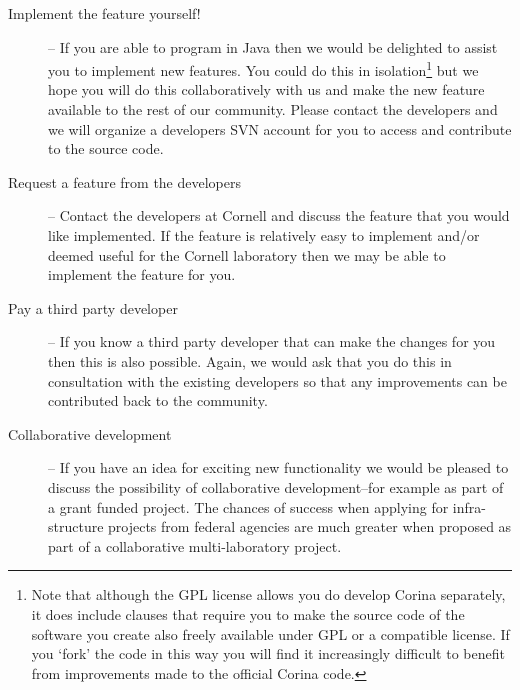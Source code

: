 \begin{description}
 \item[Implement the feature yourself!] -- If you are able to program in Java then we would be delighted to assist you to implement new features.  You could do this in isolation\footnote{Note that although the GPL license allows you do develop Corina separately, it does include clauses that require you to make the source code of the software you create also freely available under GPL or a compatible license. If you `fork' the code in this way you will find it increasingly difficult to benefit from improvements made to the official Corina code.} but we hope you will do this collaboratively with us and make the new feature available to the rest of our community.  Please contact the developers and we will organize a developers SVN account for you to access and contribute to the source code.
 \item[Request a feature from the developers] -- Contact the developers at Cornell and discuss the feature that you would like implemented.  If the feature is relatively easy to implement and/or deemed useful for the Cornell laboratory then we may be able to implement the feature for you.
 \item[Pay a third party developer] -- If you know a third party developer that can make the changes for you then this is also possible.  Again, we would ask that you do this in consultation with the existing developers so that any improvements can be contributed back to the community.
 \item[Collaborative development] -- If you have an idea for exciting new functionality we would be pleased to discuss the possibility of collaborative development--for example as part of a grant funded project.  The chances of success when applying for infra-structure projects from federal agencies are much greater when proposed as part of a collaborative multi-laboratory project.
\end{description}


